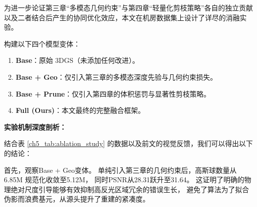为进一步论证第三章“多模态几何约束”与第四章“轻量化剪枝策略”各自的独立贡献以及二者结合后产生的协同优化效应，本文在机房数据集上设计了详尽的消融实验。

构建以下四个模型变体：

\begin{enumerate}
    \item \textbf{Base}：原始 3DGS（未添加任何改进）。
    \item \textbf{Base + Geo}：仅引入第三章的多模态深度先验与几何约束损失。
    \item \textbf{Base + Prune}：仅引入第四章的体积惩罚与显著性剪枝策略。
    \item \textbf{Full (Ours)}：本文最终的完整融合框架。
\end{enumerate}

\begin{table}[htbp]
    \centering
    \caption{机房数据集上的消融实验指标对比：几何约束与剪枝量化的协同效应}
    \label{ch5_tab:ablation_study}
    \renewcommand{\arraystretch}{1.2}
\end{table}

\textbf{实验机制深度剖析：}

结合表 \ref{ch5_tab:ablation_study} 的数据以及前文的视觉反馈，我们可以得出以下的结论：

首先，观察Base + Geo变体。
单纯引入第三章的几何约束后，高斯球数量从6.85M 规范化收敛至5.12M，
同时PSNR从28.31跃升至31.64。
这证明了明确的物理绝对尺度引导能够有效抑制高反光区域冗余的错误生长，
避免了算法为了拟合伪影而浪费基元，从源头提升了重建的紧凑度。


